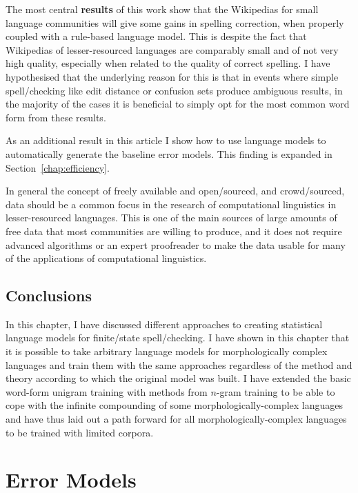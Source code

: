 \documentclass[officiallayout,final]{unihelcompling}
\begin{document}
The most central \textbf{results} of this work show that the Wikipedias for
small language communities will give some gains in spelling correction, when
properly coupled with a rule-based language model. This is despite the fact
that Wikipedias of lesser-resourced languages are comparably small and of not
very high quality, especially when related to the quality of correct spelling.
I have hypothesised that the underlying reason for this is that in events where
simple spell\-/checking like edit distance or confusion sets produce ambiguous
results, in the majority of the cases it is beneficial to simply opt for the
most common word form from these results.

As an additional result in this article I show how to use language models to
automatically generate the baseline error models. This finding is expanded in
Section~\ref{chap:efficiency}.

In general the concept of freely available and open\-/sourced, and
crowd\-/sourced, data should be a common focus in the research of computational
linguistics in lesser-resourced languages. This is one of the main sources of
large amounts of free data that most communities are willing to produce, and it
does not require advanced algorithms or an expert proofreader to make the data
usable for many of the applications of computational linguistics.

\section{Conclusions}

In this chapter, I have discussed different approaches to creating
statistical language models for finite\-/state spell\-/checking. I have
shown in this chapter that it is possible to take arbitrary language models for
morphologically complex languages and train them with the same approaches
regardless of the method and theory according to which the original model was
built. I have extended the basic word-form unigram training with methods from
\(n\)-gram training to be able to cope with the infinite compounding of some
morphologically-complex languages and have thus laid out a path forward for all
morphologically-complex languages to be trained with limited corpora.


\chapter{Error Models}
\label{chap:error-models}
\end{document}
